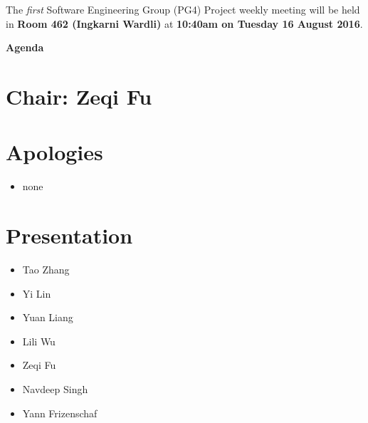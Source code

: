 \documentclass[11pt, a4paper]{article}
\begin{document}

\noindent The {\em first} Software Engineering Group (PG4) Project weekly meeting will be held in {\bf Room 462 (Ingkarni Wardli)} at {\bf 10:40am on Tuesday 16 August 2016}.



\vspace*{15pt}

\begin{center}

\huge \bf Agenda

\end{center}




\section*{Chair: Zeqi Fu}

\vspace*{10pt}




\section{Apologies}

\begin{itemize}

\item none

\end{itemize}




\section{Presentation}

\begin{itemize}

\item Tao Zhang

\item Yi Lin

\item Yuan Liang

\item Lili Wu

\item Zeqi Fu

\item Navdeep Singh

\item Yann Frizenschaf

\end{itemize}
\end{document}

